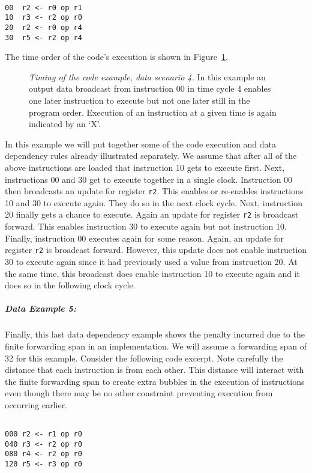 \documentclass[10pt,dvips]{article}
\begin{document}
\begin{verbatim}

00	r2 <- r0 op r1
10	r3 <- r2 op r0
20	r2 <- r0 op r4
30	r5 <- r2 op r4

\end{verbatim}

The time order of the code's execution is shown in
Figure~\ref{ex4}.

\begin{figure}
\centering
{}
\caption{{\em Timing of the code example, data scenario 4.}
In this example an output data broadcast from instruction 00
in time cycle 4 enables one later instruction to
execute but not one later still in the program order.
Execution of an instruction at a given time is
again indicated by an `X'.}
\label{ex4}
\end{figure}

In this example we will put together some of the
code execution and data dependency rules already illustrated
separately.
We assume that after all of the above instructions are loaded
that instruction 10 gets to execute first.
Next, instructions 00 and 30 get to execute together in a single
clock.  Instruction 00 then broadcasts an update for register
{\tt r2}.
This enables or re-enables instructions 10 and 30 to execute again.
They do so in the next clock cycle.  Next, instruction 20 finally
gets a chance to execute.  Again an update for register
{\tt r2}
is broadcast forward.  This enables instruction 30 to execute again
but not instruction 10.
Finally, instruction 00 executes again for some reason.
Again, an update for register
{\tt r2}
is broadcast forward.  However, this update does not enable
instruction 30 to execute again since it had previously used
a value from instruction 20.  At the same time, this broadcast does
enable instruction 10 to execute again and it does so in the following
clock cycle.


\subparagraph{Data Example 5: }
Finally, this last data dependency example shows the
penalty incurred due to the finite forwarding span
in an implementation.  We will assume a forwarding span
of 32 for this example.  Consider the following
code excerpt.  Note carefully the distance that each instruction
is from each other.  This distance will interact with
the finite forwarding span to create extra bubbles in
the execution of instructions even though there may be no other
constraint preventing execution from occurring earlier.

\begin{verbatim}

000	r2 <- r1 op r0
040	r3 <- r2 op r0
080	r4 <- r2 op r0
120	r5 <- r3 op r0

\end{verbatim}
\end{document}
